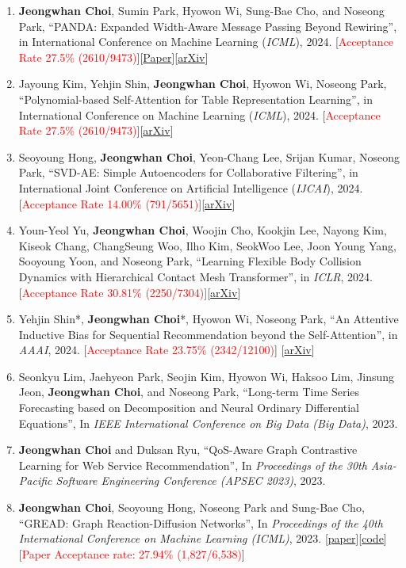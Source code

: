 \documentclass[10pt]{article}
\newenvironment{changemargin}[2]{
  \begin{list}{}{
    \setlength{\topsep}{0pt}
    \setlength{\leftmargin}{#1}
    \setlength{\rightmargin}{#2}
    \setlength{\listparindent}{\parindent}
    \setlength{\itemindent}{\parindent}
    \setlength{\parsep}{\parskip}
  }
  \item[]}{\end{list}
}
\newcommand{\RED}[1]{\textcolor{red}{#1}}
\newenvironment{body} {
	\vspace*{-16pt}
	\begin{changemargin}{-0.25in}{-0.5in}
  }
	{\end{changemargin}
}
\begin{document}
\begin{body}
\begin{enumerate}
    \item \textbf{Jeongwhan Choi}, Sumin Park, Hyowon Wi,  Sung-Bae Cho, and Noseong Park, ``PANDA: Expanded Width-Aware Message Passing Beyond Rewiring'', in International Conference on Machine Learning (\textit{ICML}), 2024. [\RED{Acceptance Rate 27.5\% (2610/9473)}][\href{https://proceedings.mlr.press/v235/choi24f.html}{Paper}][\href{https://arxiv.org/abs/2406.03671}{arXiv}]
    \item Jayoung Kim, Yehjin Shin, \textbf{Jeongwhan Choi}, Hyowon Wi, Noseong Park, ``Polynomial-based Self-Attention for Table Representation Learning'',  in International Conference on Machine Learning (\textit{ICML}), 2024. [\RED{Acceptance Rate 27.5\% (2610/9473)}][\href{https://arxiv.org/abs/2312.07753}{arXiv}]
    \item Seoyoung Hong, \textbf{Jeongwhan Choi}, Yeon-Chang Lee, Srijan Kumar, Noseong Park, ``SVD-AE: Simple Autoencoders for Collaborative Filtering'', in International Joint Conference on Artificial Intelligence (\textit{IJCAI}), 2024. [\RED{Acceptance Rate 14.00\% (791/5651)}][\href{https://arxiv.org/abs/2405.04746}{arXiv}]
    \item Youn-Yeol Yu, \textbf{Jeongwhan Choi}, Woojin Cho, Kookjin Lee, Nayong Kim, Kiseok Chang, ChangSeung Woo, Ilho Kim, SeokWoo Lee, Joon Young Yang, Sooyoung Yoon, and Noseong Park, ``Learning Flexible Body Collision Dynamics with Hierarchical Contact Mesh Transformer'',  in \textit{ICLR}, 2024. [\RED{Acceptance Rate  30.81\% (2250/7304)}][\href{https://arxiv.org/abs/2312.12467}{arXiv}]
    \item Yehjin Shin*, \textbf{Jeongwhan Choi}*, Hyowon Wi, Noseong Park, ``An Attentive Inductive Bias for Sequential Recommendation beyond the Self-Attention'',  in \textit{AAAI}, 2024. [\RED{Acceptance Rate 23.75\% (2342/12100)}] [\href{https://arxiv.org/abs/2312.10325}{arXiv}]
    \item Seonkyu Lim, Jaehyeon Park, Seojin Kim, Hyowon Wi, Haksoo Lim, Jinsung Jeon, \textbf{Jeongwhan Choi}, and Noseong Park, ``Long-term Time Series Forecasting based on Decomposition and Neural Ordinary Differential Equations'', In \emph{IEEE International Conference on Big Data (Big Data)}, 2023.
    \item \textbf{Jeongwhan Choi} and Duksan Ryu, ``QoS-Aware Graph Contrastive Learning for Web Service Recommendation'', In \emph{Proceedings of the 30th Asia-Pacific Software Engineering Conference (APSEC 2023)}, 2023.
    \item \textbf{Jeongwhan Choi}, Seoyoung Hong, Noseong Park and Sung-Bae Cho, ``GREAD: Graph Reaction-Diffusion Networks'', In \emph{Proceedings of the 40th International Conference on Machine Learning (ICML)}, 2023. [\href{http://proceedings.mlr.press/v202/choi23a}{paper}][\href{https://github.com/jeongwhanchoi/GREAD}{code}][\RED{Paper Acceptance rate: 27.94\% (1,827/6,538)}]

\end{enumerate}
\end{body}
\end{document}
